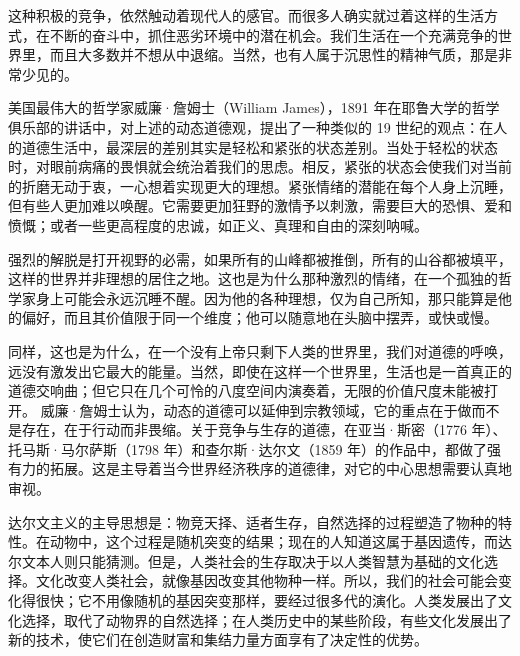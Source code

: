 这种积极的竞争，依然触动着现代人的感官。而很多人确实就过着这样的生活方式，在不断的奋斗中，抓住恶劣环境中的潜在机会。我们生活在一个充满竞争的世界里，而且大多数并不想从中退缩。当然，也有人属于沉思性的精神气质，那是非常少见的。

美国最伟大的哲学家威廉·詹姆士（William James），1891 年在耶鲁大学的哲学俱乐部的讲话中，对上述的动态道德观，提出了一种类似的 19 世纪的观点：在人的道德生活中，最深层的差别其实是轻松和紧张的状态差别。当处于轻松的状态时，对眼前病痛的畏惧就会统治着我们的思虑。相反，紧张的状态会使我们对当前的折磨无动于衷，一心想着实现更大的理想。紧张情绪的潜能在每个人身上沉睡，但有些人更加难以唤醒。它需要更加狂野的激情予以刺激，需要巨大的恐惧、爱和愤慨；或者一些更高程度的忠诚，如正义、真理和自由的深刻呐喊。

强烈的解脱是打开视野的必需，如果所有的山峰都被推倒，所有的山谷都被填平，这样的世界并非理想的居住之地。这也是为什么那种激烈的情绪，在一个孤独的哲学家身上可能会永远沉睡不醒。因为他的各种理想，仅为自己所知，那只能算是他的偏好，而且其价值限于同一个维度；他可以随意地在头脑中摆弄，或快或慢。

同样，这也是为什么，在一个没有上帝只剩下人类的世界里，我们对道德的呼唤，远没有激发出它最大的能量。当然，即使在这样一个世界里，生活也是一首真正的道德交响曲；但它只在几个可怜的八度空间内演奏着，无限的价值尺度未能被打开。 威廉·詹姆士认为，动态的道德可以延伸到宗教领域，它的重点在于做而不是存在，在于行动而非畏缩。关于竞争与生存的道德，在亚当·斯密（1776 年）、托马斯·马尔萨斯（1798 年）和查尔斯·达尔文（1859 年）的作品中，都做了强有力的拓展。这是主导着当今世界经济秩序的道德律，对它的中心思想需要认真地审视。

达尔文主义的主导思想是：物竞天择、适者生存，自然选择的过程塑造了物种的特性。在动物中，这个过程是随机突变的结果；现在的人知道这属于基因遗传，而达尔文本人则只能猜测。但是，人类社会的生存取决于以人类智慧为基础的文化选择。文化改变人类社会，就像基因改变其他物种一样。所以，我们的社会可能会变化得很快；它不用像随机的基因突变那样，要经过很多代的演化。人类发展出了文化选择，取代了动物界的自然选择；在人类历史中的某些阶段，有些文化发展出了新的技术，使它们在创造财富和集结力量方面享有了决定性的优势。


